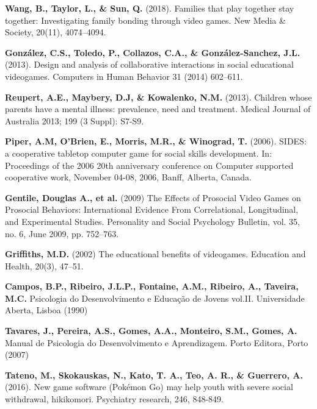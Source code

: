 \documentclass[runningheads]{llncs}
\begin{document}
\begin{thebibliography}{8}

   \textbf{Wang, B., Taylor, L., \& Sun, Q.} (2018). Families that play together stay together: Investigating family bonding through video games. New Media \& Society, 20(11), 4074–4094. 

 \textbf{González, C.S., Toledo, P., Collazos, C.A., \& González-Sanchez, J.L.} (2013). Design and analysis of collaborative interactions in social educational videogames. Computers in Human Behavior 31 (2014) 602–611. 

 \textbf{Reupert, A.E., Maybery, D.J, \& Kowalenko, N.M.} (2013). Children whose parents have a mental illness: prevalence, need and treatment. Medical Journal of Australia 2013; 199 (3 Suppl): S7-S9. 

 \textbf{Piper, A.M, O'Brien, E., Morris, M.R., \& Winograd, T.} (2006). SIDES: a cooperative tabletop computer game for social skills development. In: Proceedings of the 2006 20th anniversary conference on Computer supported cooperative work, November 04-08, 2006, Banff, Alberta, Canada. 

 \textbf{Gentile, Douglas A., et al.} (2009) The Effects of Prosocial Video Games on Prosocial Behaviors: International Evidence From Correlational, Longitudinal, and Experimental Studies. Personality and Social Psychology Bulletin, vol. 35, no. 6, June 2009, pp. 752–763. 

 \textbf{Griffiths, M.D.} (2002) The educational benefits of videogames. Education and Health, 20(3), 47–51.

 \textbf{Campos, B.P., Ribeiro, J.L.P., Fontaine, A.M., Ribeiro, A., Taveira, M.C.} Psicologia do Desenvolvimento e Educação de Jovens vol.II. Universidade Aberta, Lisboa (1990) 

 \textbf{Tavares, J., Pereira, A.S., Gomes, A.A., Monteiro, S.M., Gomes, A.} Manual de Psicologia do Desenvolvimento e Aprendizagem. Porto Editora, Porto (2007)

 	\textbf{Tateno, M., Skokauskas, N., Kato, T. A., Teo, A. R., & Guerrero, A.} (2016). New game software (Pokémon Go) may help youth with severe social withdrawal, hikikomori. Psychiatry research, 246, 848-849. 


\end{thebibliography}
\end{document}

